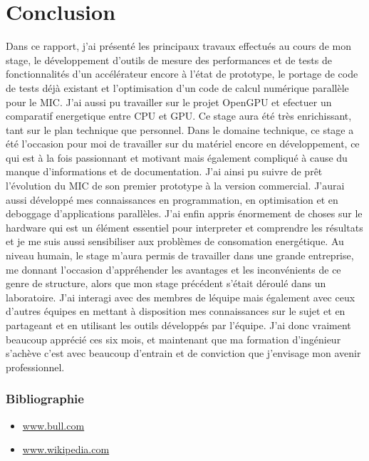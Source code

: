 \documentclass[11pt]{article}
\begin{document}
\part{Conclusion}
Dans ce rapport, j'ai présenté les principaux travaux effectués au cours de mon stage, le développement d'outils de mesure des 
performances et de tests de fonctionnalités d'un accélérateur encore à l'état de prototype, le portage de code de tests déjà 
existant et l'optimisation d'un code de calcul numérique parallèle pour le MIC. J'ai aussi pu travailler sur le projet OpenGPU 
et efectuer un comparatif energetique entre CPU et GPU. Ce stage aura été très enrichissant, tant sur le plan 
technique que personnel. \newline
\newline
Dans le domaine technique, ce stage a été l'occasion pour moi de travailler sur du matériel encore en développement, ce qui est 
à la fois passionnant et motivant mais également compliqué à cause du manque d'informations et de documentation. J'ai ainsi pu 
suivre de prêt l'évolution du MIC de son premier prototype à la version commercial. J'aurai aussi développé mes connaissances en 
programmation, en optimisation et en deboggage d'applications parallèles. J'ai enfin appris énormement de choses sur le hardware 
qui est un élément essentiel pour interpreter et comprendre les résultats et je me suis aussi sensibiliser aux problèmes de consomation 
energétique. \newline
\newline
Au niveau humain, le stage m'aura permis de travailler dans une grande entreprise, me donnant l'occasion
d'appréhender les avantages et les inconvénients de ce genre de structure, alors que mon stage précédent s'était déroulé dans 
un laboratoire. J'ai interagi avec des membres de léquipe mais également avec ceux d'autres équipes en mettant à disposition 
mes connaissances sur le sujet et en partageant et en utilisant les outils développés par l'équipe. \newline
\newline
J'ai donc vraiment beaucoup apprécié ces six mois, et maintenant que ma formation d'ingénieur
s'achève c'est avec beaucoup d'entrain et de conviction que j'envisage mon avenir professionnel.

\newpage
{}
\appendix
\section{Bibliographie}
\begin{itemize}
\item \url{www.bull.com}
\item \url{www.wikipedia.com}
\end{itemize}
\end{document}
